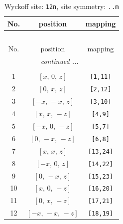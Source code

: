 \documentclass[fleqn,8pt]{jsarticle}
\begin{document}
\begin{longtable}{ccc}
\caption{Wyckoff site: {\tt 12n}, site symmetry: {\tt ..m}}
 \\
 \hline \hline
No. & position & mapping \\ \hline \endfirsthead

\multicolumn{2}{l}{\tablename\ \thetable{}} \\
 \hline \hline
No. & position & mapping \\ \hline \endhead

 \hline \hline
\multicolumn{2}{r}{\footnotesize\it continued ...} \\ \endfoot

 \hline \hline
\multicolumn{2}{r}{} \\ \endlastfoot

1 & $\left[ x,\, 0,\, z \right]$ & {\tt [1,11]} \\ \hline
2 & $\left[ 0,\, x,\, z \right]$ & {\tt [2,12]} \\ \hline
3 & $\left[ - x,\, - x,\, z \right]$ & {\tt [3,10]} \\ \hline
4 & $\left[ x,\, x,\, - z \right]$ & {\tt [4,9]} \\ \hline
5 & $\left[ - x,\, 0,\, - z \right]$ & {\tt [5,7]} \\ \hline
6 & $\left[ 0,\, - x,\, - z \right]$ & {\tt [6,8]} \\ \hline
7 & $\left[ x,\, x,\, z \right]$ & {\tt [13,24]} \\ \hline
8 & $\left[ - x,\, 0,\, z \right]$ & {\tt [14,22]} \\ \hline
9 & $\left[ 0,\, - x,\, z \right]$ & {\tt [15,23]} \\ \hline
10 & $\left[ x,\, 0,\, - z \right]$ & {\tt [16,20]} \\ \hline
11 & $\left[ 0,\, x,\, - z \right]$ & {\tt [17,21]} \\ \hline
12 & $\left[ - x,\, - x,\, - z \right]$ & {\tt [18,19]} \\
\end{longtable}
\renewcommand{\arraystretch}{1.2}
\end{document}
